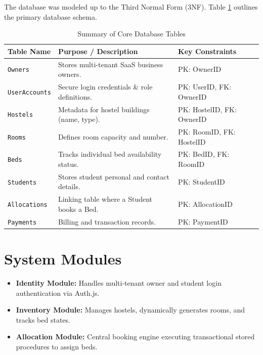 \documentclass[12pt, a4paper]{report}
\begin{document}
The database was modeled up to the Third Normal Form (3NF). Table \ref{tab:schema_summary} outlines the primary database schema.

\begin{table}[H]
    \centering
    \caption{Summary of Core Database Tables}
    \label{tab:schema_summary}
    \begin{tabularx}{\textwidth}{|l|X|l|}
        \hline
        \textbf{Table Name} & \textbf{Purpose / Description} & \textbf{Key Constraints} \\
        \hline
        \texttt{Owners} & Stores multi-tenant SaaS business owners. & PK: OwnerID \\
        \hline
        \texttt{UserAccounts} & Secure login credentials \& role definitions. & PK: UserID, FK: OwnerID \\
        \hline
        \texttt{Hostels} & Metadata for hostel buildings (name, type). & PK: HostelID, FK: OwnerID \\
        \hline
        \texttt{Rooms} & Defines room capacity and number. & PK: RoomID, FK: HostelID \\
        \hline
        \texttt{Beds} & Tracks individual bed availability status. & PK: BedID, FK: RoomID \\
        \hline
        \texttt{Students} & Stores student personal and contact details. & PK: StudentID \\
        \hline
        \texttt{Allocations} & Linking table where a Student books a Bed. & PK: AllocationID \\
        \hline
        \texttt{Payments} & Billing and transaction records. & PK: PaymentID \\
        \hline
    \end{tabularx}
\end{table}

\section{System Modules}
\begin{itemize}
    \item \textbf{Identity Module:} Handles multi-tenant owner and student login authentication via Auth.js.
    \item \textbf{Inventory Module:} Manages hostels, dynamically generates rooms, and tracks bed states.
    \item \textbf{Allocation Module:} Central booking engine executing transactional stored procedures to assign beds.
\end{itemize}
\end{document}
